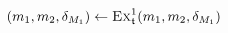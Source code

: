 \begin{algorithmic}[1]
        \algindentskip
            \State \Return{$\bot$} \label{algo:synchronization:execute_bidirectional_transformation:line:returnbotconsistency}
        \EndIf
        \algblockskip

            \State $(\model{m}{1}, \model{m}{2}, \change{\metamodel{M}{1}}) \gets \function{Ex}_\transformation{t}^1(\model{m}{1}, \model{m}{2}, \change{\metamodel{M}{1}})$
                \State \Return{$\bot$} \label{algo:synchronization:execute_bidirectional_transformation:line:returnbotexecution}
            \EndIf
        \EndWhile
        \algblockskip

        \State {} \label{algo:synchronization:execute_bidirectional_transformation:line:returnresult}
        \algindentskip
    \EndProcedure
\end{algorithmic}